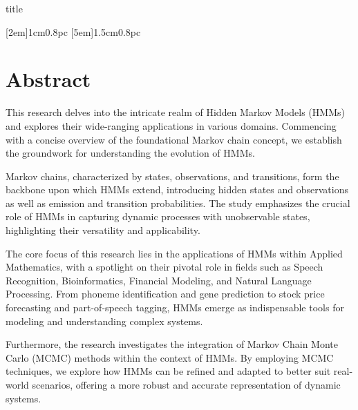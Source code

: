 \documentclass{englishreport}
\begin{document}




{title}

[2em]{}{1cm}{0.8pc}
[5em]{}{1.5cm}{0.8pc}
\tableofcontents

\newpage
\section*{Abstract}

This research delves into the intricate realm of Hidden Markov Models (HMMs) and explores their wide-ranging applications in various domains. Commencing with a concise overview of the foundational Markov chain concept, we establish the groundwork for understanding the evolution of HMMs. 

Markov chains, characterized by states, observations, and transitions, form the backbone upon which HMMs extend, introducing hidden states and observations as well as emission and transition probabilities. The study emphasizes the crucial role of HMMs in capturing dynamic processes with unobservable states, highlighting their versatility and applicability.

The core focus of this research lies in the applications of HMMs within Applied Mathematics, with a spotlight on their pivotal role in fields such as Speech Recognition, Bioinformatics, Financial Modeling, and Natural Language Processing. From phoneme identification and gene prediction to stock price forecasting and part-of-speech tagging, HMMs emerge as indispensable tools for modeling and understanding complex systems.

Furthermore, the research investigates the integration of Markov Chain Monte Carlo (MCMC) methods within the context of HMMs. By employing MCMC techniques, we explore how HMMs can be refined and adapted to better suit real-world scenarios, offering a more robust and accurate representation of dynamic systems.
\end{document}
